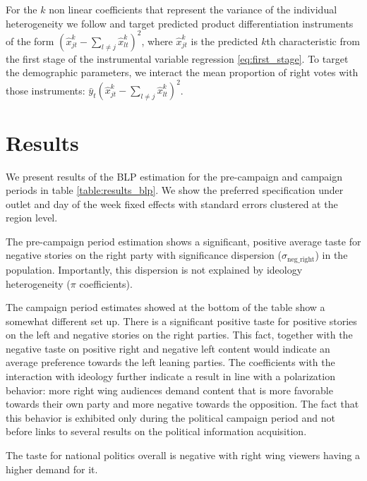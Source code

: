 \documentclass[12pt]{article}
\begin{document}
	
	For the $ k $ non linear coefficients that represent the variance of the individual heterogeneity we follow \cite{gandhi2019measuring} and target predicted product differentiation instruments of the form $ \left(\hat{x}_{jt}^k- \sum_{l \neq j} \hat{x}_{lt}^k\right)^2 $, where $ \hat{x}_{jt}^k $ is the predicted $ k $th characteristic from the first stage of the instrumental variable regression \ref{eq:first_stage}. To target the demographic parameters, we interact the mean proportion of right votes with those instruments: $ \bar{y}_t\left(\hat{x}_{jt}^k- \sum_{l \neq j} \hat{x}_{lt}^k\right)^2 $.
	
	
	
	
	
	
	\section{Results}
	
	\label{section:results}
	
	
	We present results of the BLP estimation for the pre-campaign and campaign periods in table   \ref{table:results_blp}. We show the preferred specification under outlet and day of the week fixed effects with standard errors clustered at the region level. 
	
	The pre-campaign period estimation shows a significant, positive average taste for negative stories on the right party with significance dispersion ($\sigma_{\text{neg\_right}}$) in the population. Importantly, this dispersion is not explained by ideology heterogeneity ($\pi$ coefficients).
	
	
	
	The campaign period estimates showed at the bottom of the table show a somewhat different set up. There is a significant positive taste for positive stories on the left and negative stories on the right parties. This fact, together with the negative taste on positive right and negative left content would indicate an average preference towards the left leaning parties. The coefficients with the interaction with ideology further indicate a result in line with a polarization behavior: more right wing audiences demand content that is more favorable towards their own party and more negative towards the opposition. The fact that this behavior is exhibited only during the political campaign period and not before links to several results on the political information acquisition.  
	
	The taste for national politics overall is negative with right wing viewers having a higher demand for it. 
	
\end{document}
